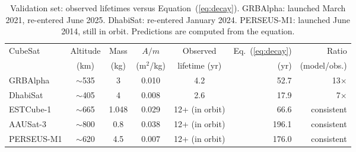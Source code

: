 \begin{table}[H]
\centering
\caption{Validation set: observed lifetimes versus Equation~(\ref{eq:decay}). GRBAlpha: launched March 2021, re-entered June 2025. DhabiSat: re-entered January 2024. PERSEUS-M1: launched June 2014, still in orbit. Predictions are computed from the equation.}
\label{tab:val}
\small
\begin{tabular}{lccccrr}
\toprule
CubeSat & Altitude & Mass & $A/m$ & Observed & Eq.~(\ref{eq:decay}) & Ratio \\
 & (km) & (kg) & (m$^2$/kg) & lifetime (yr) & (yr) & (model/obs.) \\
\midrule
GRBAlpha & $\sim$535 & 3 & 0.010 & 4.2 & 52.7 & 13$\times$ \\
DhabiSat & $\sim$405 & 4 & 0.008 & 2.6 & 17.9 & 7$\times$ \\
ESTCube-1 & $\sim$665 & 1.048 & 0.029 & 12+ (in orbit) & 66.6 & consistent \\
AAUSat-3 & $\sim$800 & 0.8 & 0.038 & 12+ (in orbit) & 196.1 & consistent \\
PERSEUS-M1 & $\sim$620 & 4.5 & 0.007 & 12+ (in orbit) & 176.0 & consistent \\
\bottomrule
\end{tabular}
\end{table}
